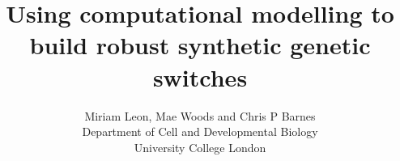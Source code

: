 \documentclass[10pt,a4paper]{memoir}
\begin{document}
\title{Using computational modelling to build robust synthetic genetic switches}
\author{Miriam Leon, Mae Woods and Chris P Barnes\\ Department of Cell and Developmental
 Biology \\ University College London}
\date{}
\maketitle






\end{document}
